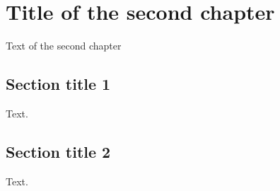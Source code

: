 \chapter{Title of the second chapter}
\label{chap:1}

Text of the second chapter

\section{Section title 1}
\label{sec:1}

Text.

\section{Section title 2}

Text.
